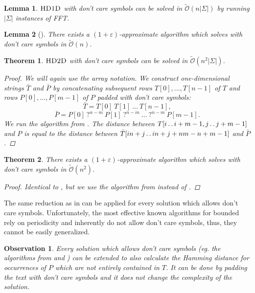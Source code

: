 \documentclass[11pt]{article}
\def\dd{\mathinner{.\,.}}
\newcommand{\tO}{\tilde{\mathcal{O}}}
\theoremstyle{plain}
\newtheorem{theorem}{Theorem}
\newtheorem{lemma}{Lemma}
\newtheorem{observation}{Observation}
\theoremstyle{definition}
\theoremstyle{remark}
\begin{document}
\begin{lemma}\label{sigman1d}
	$\textsc{HD1D}$ with don't care symbols can be solved in $\tO(n|\Sigma|)$ by running $|\Sigma|$ instances of FFT.
\end{lemma}


\begin{lemma}[\cite{Karloff1993}]\label{approx1d}
	There exists a $(1 + \varepsilon)$-approximate algorithm which solves \hd with don't care symbols in $\tO(n)$.
\end{lemma}


\begin{theorem}\label{sigman2d}
	$\textsc{HD2D}$ with don't care symbols can be solved in $\tO(n^2|\Sigma|)$.
	\begin{proof}
		We will again use the array notation.
		We construct one-dimensional strings $\bar{T}$ and $\bar{P}$ by concatenating subsequent rows $T[0], \dots, T[n - 1]$ of $T$ and rows $P[0], \dots, P[m - 1]$ of $P$ padded with don't care symbols:
		\[ \bar{T} = T[0] \ T[1] \ \dots \ T[n - 1], \]
		\[ \bar{P} = P[0] \ \texttt{?}^{n - m} \ P[1] \ \texttt{?}^{n - m} \ \dots \ \texttt{?}^{n - m} \ P[m - 1].\]
		We run the algorithm from .
		The distance between $T[i \dd i + m - 1, j \dd j + m - 1]$ and $P$ is equal to the distance between $\bar{T}[in + j \dd in + j + nm - n + m - 1]$ and $\bar{P}$.
	\end{proof}
\end{theorem}


\begin{theorem}\label{approx2d}
	There exists a $(1 + \varepsilon)$-approximate algorithm which solves \HD with don't care symbols in $\tO(n^2)$.
	\begin{proof}
		Identical to , but we use the algorithm from  instead of .
	\end{proof}
\end{theorem}


The same reduction as in  can be applied for every \hd solution which allows don't care symbols.
Unfortunately, the most effective known algorithms for bounded \hd~\cite{Clifford2015,Gawrychowski2017} rely on periodicity and inherently do not allow don't care symbols, thus, they cannot be easily generalized.


\begin{observation}\label{dontcare_padding}
	Every \HD solution which allows don't care symbols (eg. the algorithms from  and ) can be extended to also calculate the Hamming distance for occurrences of $P$ which are not entirely contained in $T$.
	It can be done by padding the text with don't care symbols and it does not change the complexity of the solution.
\end{observation}
\end{document}
